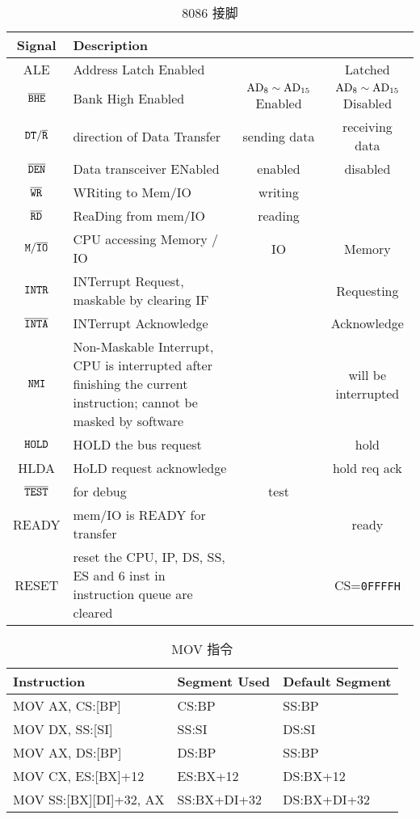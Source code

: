 \begin{table*}
	\centering
	\caption{8086 接脚}
	\begin{tabular}{|>{\ttfamily}c|p{13em}|c|c|}
		\hline
		\bfseries Signal &\bfseries Description &\ttfamily 0 &\ttfamily 1 \\
		\hline
		ALE & Address Latch Enabled &  & Latched  \\
		\hline
		$\tt \overline{BHE}$ & Bank High Enabled & $\rm AD_8\sim \rm AD_{15}$ Enabled & $\rm AD_8\sim\rm AD_{15}$ Disabled \\
		\hline
		$\tt DT/\overline{R}$ & direction of Data Transfer & sending data & receiving data \\
		\hline
		$\tt \overline{DEN}$ & Data transceiver ENabled & enabled & disabled \\
		\hline
		$\tt \overline{WR}$ & WRiting to Mem/IO & writing & \\
		\hline
		$\tt \overline{RD}$ & ReaDing from mem/IO & reading & \\
		\hline
		$\tt M/\overline{IO}$ & CPU accessing Memory / IO & IO & Memory \\
		\hline
		$\tt INTR$ & INTerrupt Request, maskable by clearing IF &  & Requesting \\
		\hline
		$\tt \overline{INTA}$ & INTerrupt Acknowledge &  & Acknowledge \\
		\hline
		$\tt NMI$ & Non-Maskable Interrupt, CPU is interrupted after finishing the current instruction; cannot be masked by software &  & will be interrupted \\
		\hline
		$\tt HOLD$ & HOLD the bus request &  & hold \\
		\hline
		HLDA & HoLD request acknowledge &  & hold req ack \\
		\hline
		$\tt \overline{TEST}$ & for debug & test &  \\
		\hline
		READY & mem/IO is READY for transfer &  & ready \\
		\hline
		RESET & reset the CPU, IP, DS, SS, ES and 6 inst in instruction queue are cleared &  & CS=\texttt{0FFFFH} \\
		\hline
	\end{tabular}
\end{table*}

\begin{table*}
	\centering
	\caption{MOV 指令}
	\begin{tabular}{|>{\ttfamily}l|>{\ttfamily}l|>{\ttfamily}l|}
		\hline
		\bfseries Instruction & \bfseries Segment Used & \bfseries Default Segment \\
		\hline
		MOV AX, CS:[BP] & CS:BP & SS:BP \\
		MOV DX, SS:[SI] & SS:SI	& DS:SI \\
		MOV AX, DS:[BP] & DS:BP & SS:BP \\
		MOV CX, ES:[BX]+12 & ES:BX+12 & DS:BX+12 \\
		MOV SS:[BX][DI]+32, AX & SS:BX+DI+32 & DS:BX+DI+32 \\
		\hline
	\end{tabular}
\end{table*}

% 